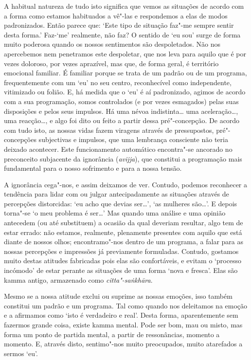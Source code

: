 A habitual natureza de
tudo isto significa que vemos as situações de acordo com a forma como estamos
habituados a vê"-las e respondemos a elas de modos padronizados. Então parece
que: `Este tipo de situação faz"-me sempre sentir desta forma.' Faz-`me'
realmente, não faz? O sentido de `eu sou' surge de forma muito poderosa quando
os nossos sentimentos são despoletados. Não nos apercebemos nem penetramos este
despoletar, que nos leva para aquilo que é por vezes doloroso, por vezes
aprazível, mas que, de forma geral, é território emocional familiar. É familiar
porque se trata de um padrão ou de um programa, frequentemente com um `eu' no
seu centro, reconhecível como independente, vitimizado ou folião. E, há medida
que o `eu' é aí padronizado, agimos de acordo com a sua programação, somos
controlados (e por vezes esmagados) pelas suas disposições e pelos seus
impulsos. Há uma névoa indistinta\ldots{} uma aceleração\ldots{}, uma reacção\ldots{}, e
algo foi dito ou feito a partir dessa pré"-concepção. De acordo com tudo isto, as
nossas vidas fazem viragens através de pressupostos, pré"-concepções subjectivas
e impulsos, que uma lembrança consciente não teria deixado acontecer. Este
funcionamento automático encontra"-se ancorado no preconceito subjacente da
ignorância (\emph{avijja}), que constitui a programação mais fundamental para o
nosso sofrimento e para a nossa tensão.

A ignorância cega"-nos, e assim deixamos de ver. Contudo, podemos reconhecer a
tendência para lidar com ou julgar antecipadamente as situações através de
percepções distorcidas: `eu acho que devias ser\ldots', `as mulheres são\ldots'.
E depois torna"-se `o meu problema é ser\ldots' Mas quando uma análise e uma
opinião antecedem (ou até substituem) a ocasião da qual deveriam resultar, algo
tem de estar errado: não estamos, realmente, plenamente presentes com aquilo que
está diante de nossos olhos; encontramo"-nos dentro de um programa, a falar para
as nossas percepções e impressões já previamente formuladas. Contudo, gostamos
muito destas atitudes fabricadas pois elas são confortáveis, e evitam o
`processo incómodo' de estar perante as situações de uma forma `nova e fresca'.
Elas são kamma antigo, armazenado como \emph{citta"-saṅkhāra}.

Mesmo se a nossa atitude exclui ou suprime as nossas emoções, isso também
constitui um padrão e um programa. Tal como quando nos deleitamos na emoção e a
afirmamos como `isto é verdadeiro e real'. Desta forma, aparentemente sem
fazermos grande coisa, existe kamma mental. Pode ser bom, mau ou misto, mas
forma um ponto de partida mental, a partir de ressonâncias, momento a momento.
E, através disto, sentimo"-nos muito preocupados, muito atarefados a sermos `eu'.

